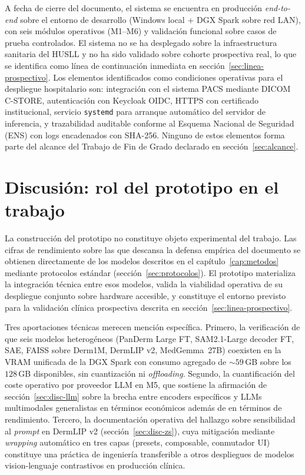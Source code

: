 A fecha de cierre del documento, el sistema se encuentra en
producción \emph{end-to-end} sobre el entorno de desarrollo
(Windows local + DGX Spark sobre red LAN), con seis módulos
operativos (M1--M6) y validación funcional sobre casos de prueba
controlados. El sistema no se ha desplegado sobre la
infraestructura sanitaria del HUSLL y no ha sido validado sobre
cohorte prospectiva real, lo que se identifica como línea de
continuación inmediata en sección~\ref{sec:linea-prospectivo}. Los
elementos identificados como condiciones operativas para el
despliegue hospitalario son: integración con el sistema PACS
mediante DICOM C-STORE, autenticación con Keycloak OIDC, HTTPS
con certificado institucional, servicio \texttt{systemd} para
arranque automático del servidor de inferencia, y trazabilidad
auditable conforme al Esquema Nacional de Seguridad (ENS) con
logs encadenados con SHA-256. Ninguno de estos elementos forma
parte del alcance del Trabajo de Fin de Grado declarado en
sección~\ref{sec:alcance}.

\section{Discusión: rol del prototipo en el trabajo}
\label{sec:dermapixel-discusion}

La construcción del prototipo no constituye objeto experimental
del trabajo. Las cifras de rendimiento sobre las que descansa la
defensa empírica del documento se obtienen directamente de los
modelos descritos en el capítulo~\ref{cap:metodos} mediante
protocolos estándar (sección~\ref{sec:protocolos}). El prototipo
materializa la integración técnica entre esos modelos, valida la
viabilidad operativa de su despliegue conjunto sobre hardware
accesible, y constituye el entorno previsto para la validación
clínica prospectiva descrita en sección~\ref{sec:linea-prospectivo}.

Tres aportaciones técnicas merecen mención específica. Primero,
la verificación de que seis modelos heterogéneos
(PanDerm Large FT, SAM2.1-Large decoder FT, SAE, FAISS sobre Derm1M,
DermLIP v2, MedGemma~27B) coexisten en la VRAM unificada de la
DGX Spark con consumo agregado de $\sim 59$\,GB sobre los
$128$\,GB disponibles, sin cuantización ni \emph{offloading}.
Segundo, la cuantificación del coste operativo por proveedor LLM
en M5, que sostiene la afirmación de sección~\ref{sec:disc-llm} sobre la
brecha entre encoders específicos y LLMs multimodales generalistas
en términos económicos además de en términos de rendimiento.
Tercero, la documentación operativa del hallazgo sobre
sensibilidad al \emph{prompt} en DermLIP v2
(sección~\ref{sec:disc-zs}), cuya mitigación mediante \emph{wrapping}
automático en tres capas (presets, composable, conmutador UI)
constituye una práctica de ingeniería transferible a otros
despliegues de modelos vision-lenguaje contrastivos en producción
clínica.

